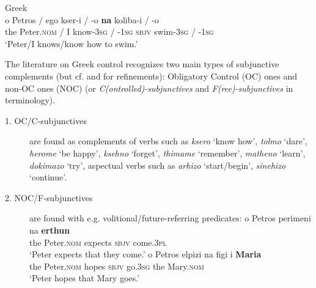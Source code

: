 \documentclass[output=paper]{langsci/langscibook}
\begin{document}
\ea%
 \label{ex:alexiadou:3}
Greek\\
\gll o  Petros / ego  kser-i / -o        \textbf{na}    koliba-i / -o\\
  the    Peter.\textsc{nom} / I  know-\textsc{3sg} / -\textsc{1sg}    \textsc{sbjv}  swim-\textsc{3sg} / -\textsc{1sg}\\
\glt  ‘Peter/I knows/know how to swim.’
\z

The literature on Greek control recognizes two main types of subjunctive complements (but cf. \citealt{Spyropoulos2007} and \citealt{Roussou2009} for refinements): Obligatory Control (OC) ones and non-OC ones (NOC) (or \textit{C(ontrolled)-subjunctives} and \textit{F(ree)-subjunctives} in  terminology).

\begin{description}
\item[1. OC/C-subjunctives] are found as complements of verbs such as \textit{ksero} ‘know how’, \textit{tolmo} ‘dare’, \textit{herome} ‘be happy’, \textit{ksehno} ‘forget’, \textit{thimame} ‘remember’, \textit{matheno} ‘learn’, \textit{dokimazo} ‘try’, aspectual verbs such as \textit{arhizo} ‘start\slash begin’, \textit{sinehizo} ‘continue’.
\ea%
    \label{ex:alexiadou:4}
\z
\z
\item[2. NOC/F-subjunctives] are found with e.g. volitional\slash future-referring predicates:
\ea%
    \label{ex:alexiadou:5}
    \ea\gll o    Petros      perimeni  na    \textbf{erthun}\\
       the    Peter.\textsc{nom} expects  \textsc{sbjv}  come.\textsc{3pl}\\
        \glt ‘Peter expects that they come.’
     \ex\gll  o     Petros    elpizi  na    figi     i     \textbf{Maria}\\
          the    Peter.\textsc{nom}   hopes  \textsc{sbjv}  go.\textsc{3sg}  the    Mary.\textsc{nom}\\
         \glt ‘Peter hopes that Mary goes.’
\z
\z
\end{description}
\end{document}
